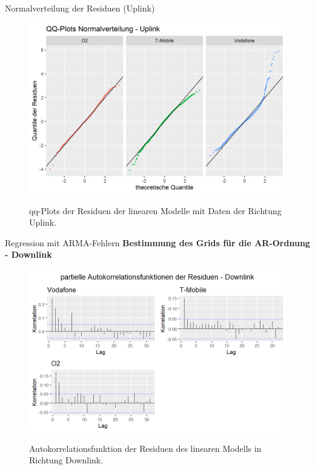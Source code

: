 \begin{frame}{Normalverteilung der Residuen (Uplink)}
	\begin{figure}
		\includegraphics[scale=0.35]{plots/arima/uplink/res_qq}\\
		\caption{qq-Plots der Residuen der linearen Modelle mit Daten der Richtung Uplink.}
		\label{res_qq}
	\end{figure}
\end{frame}

\begin{frame}{Regression mit ARMA-Fehlern}
	\textbf{Bestimmung des Grids für die AR-Ordnung - Downlink}
	\begin{figure}
		\includegraphics[scale=0.38]{plots/arima/downlink/res_pacf}\\
		\caption{Autokorrelationsfunktion der Residuen des linearen Modells in Richtung Downlink.}
		\label{res_pacf_dl}
	\end{figure}	
\end{frame}

